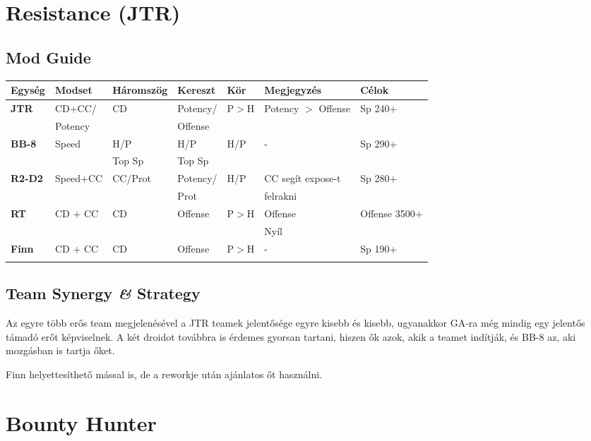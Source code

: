 \documentclass[11pt]{report}
\begin{document}
\chapter{Resistance (JTR)}
\section{Mod Guide}
\begin{center}
    \begin{tabular}{|l | l | l | l | l | l | l |}
        \hline
        Egység & Modset & Háromszög & Kereszt & Kör & Megjegyzés & Célok\\ \hline
        \textbf{JTR} & CD+CC/ & CD & Potency/ & P$>$H & Potency $>$ Offense & Sp 240+\\
        & Potency &  & Offense &  &  & \\ \hline
        \textbf{BB-8} & Speed & H/P & H/P & H/P & - & Sp 290+\\
        &  & Top Sp & Top Sp &  &  & \\ \hline
        \textbf{R2-D2} & Speed+CC & CC/Prot & Potency/ & H/P & CC segít expose-t & Sp 280+\\
        &  &  & Prot &  & felrakni & \\ \hline
        \textbf{RT} & CD + CC & CD & Offense & P$>$H & Offense & Offense 3500+\\
        &  &  &  &  & Nyíl & \\ \hline
        \textbf{Finn} & CD + CC & CD & Offense & P$>$H & - & Sp 190+\\
        &  &  &  &  &  & \\ \hline   
    \end{tabular}
\end{center}
\section{Team Synergy \textit{\&} Strategy}
Az egyre több erős team megjelenésével a JTR teamek jelentősége egyre kisebb és kisebb, ugyanakkor GA-ra még mindig egy jelentős támadó erőt képviselnek. A két droidot továbbra is érdemes gyorsan tartani, hiszen ők azok, akik a teamet indítják, és BB-8 az, aki mozgásban is tartja őket.\par
Finn helyettesíthető mással is, de a reworkje után ajánlatos őt használni.


\chapter{Bounty Hunter}
\end{document}
